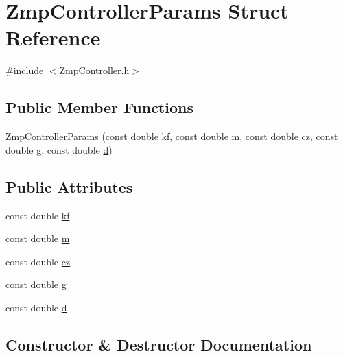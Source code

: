 \hypertarget{structZmpControllerParams}{}\section{Zmp\+Controller\+Params Struct Reference}
\label{structZmpControllerParams}


{\ttfamily \#include $<$Zmp\+Controller.\+h$>$}

\subsection*{Public Member Functions}
\begin{DoxyCompactItemize}
\item 
\hyperlink{structZmpControllerParams_a6026a235dd88b3dde8cbba9ed5bb80fb}{Zmp\+Controller\+Params} (const double \hyperlink{structZmpControllerParams_a6138cbf819799519abd3864bd8bf05cf}{kf}, const double \hyperlink{structZmpControllerParams_a1a3eea24e276953f2e74c4066b24106c}{m}, const double \hyperlink{structZmpControllerParams_ae0d24b7bdae3eb228b9db827934d0e87}{cz}, const double \hyperlink{structZmpControllerParams_af97a6bcc6b60e8372dd444d695d705f7}{g}, const double \hyperlink{structZmpControllerParams_a00f5d68e5a1215bbe7b722375d95d243}{d})
\end{DoxyCompactItemize}
\subsection*{Public Attributes}
\begin{DoxyCompactItemize}
\item 
const double \hyperlink{structZmpControllerParams_a6138cbf819799519abd3864bd8bf05cf}{kf}
\item 
const double \hyperlink{structZmpControllerParams_a1a3eea24e276953f2e74c4066b24106c}{m}
\item 
const double \hyperlink{structZmpControllerParams_ae0d24b7bdae3eb228b9db827934d0e87}{cz}
\item 
const double \hyperlink{structZmpControllerParams_af97a6bcc6b60e8372dd444d695d705f7}{g}
\item 
const double \hyperlink{structZmpControllerParams_a00f5d68e5a1215bbe7b722375d95d243}{d}
\end{DoxyCompactItemize}


\subsection{Constructor \& Destructor Documentation}
\hypertarget{structZmpControllerParams_a6026a235dd88b3dde8cbba9ed5bb80fb}{}\label{structZmpControllerParams_a6026a235dd88b3dde8cbba9ed5bb80fb} 
